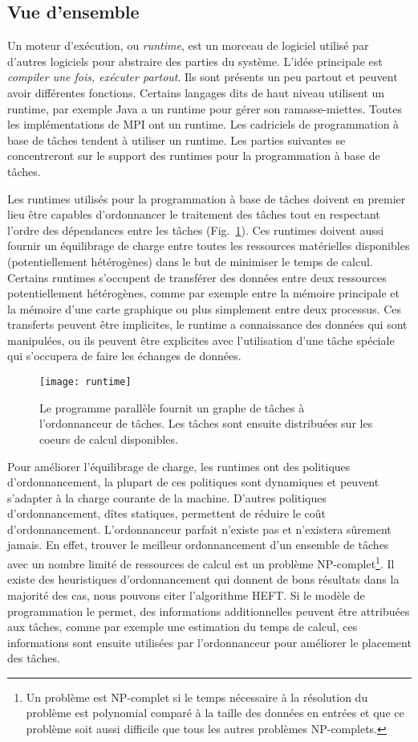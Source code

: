 \subsection{Vue d'ensemble}
Un moteur d'exécution, ou {\em runtime}, est un morceau de logiciel utilisé par d'autres logiciels pour abstraire des parties du système.
%
L'idée principale est {\em compiler une fois, exécuter partout}.
%
Ils sont présents un peu partout et peuvent avoir différentes fonctions.
%
Certains langages dits de haut niveau utilisent un runtime, par exemple Java a un runtime pour gérer son ramasse-miettes.
%
Toutes les implémentations de MPI ont un runtime.
%
Les cadriciels de programmation à base de tâches tendent à utiliser un runtime.
%
Les parties suivantes se concentreront sur le support des runtimes pour la programmation à base de tâches.

Les runtimes utilisés pour la programmation à base de tâches doivent en premier lieu être capables d'ordonnancer le traitement des tâches tout en respectant l'ordre des dépendances entre les tâches (Fig.~\ref{fig:runtime}).
%
Ces runtimes doivent aussi fournir un équilibrage de charge entre toutes les ressources matérielles disponibles (potentiellement hétérogènes) dans le but de minimiser le temps de calcul.
%
Certains runtimes s'occupent de transférer des données entre deux ressources potentiellement hétérogènes, comme par exemple entre la mémoire principale et la mémoire d'une carte graphique ou plus simplement entre deux processus.
%
Ces transferts peuvent être implicites, le runtime a connaissance des données qui sont manipulées, ou ils peuvent être explicites avec l'utilisation d'une tâche spéciale qui s'occupera de faire les échanges de données.
\begin{figure}
  \centering
  \texttt{[image: runtime]}
  \caption{Le programme parallèle fournit un graphe de tâches à l'ordonnanceur de tâches. Les tâches sont ensuite distribuées sur les coeurs de calcul disponibles.}
  \label{fig:runtime}
\end{figure}

Pour améliorer l'équilibrage de charge, les runtimes ont des politiques d'ordonnancement, la plupart de ces politiques sont dynamiques et peuvent s'adapter à la charge courante de la machine.
%
D'autres politiques d'ordonnancement, dîtes statiques, permettent de réduire le coût d'ordonnancement.
%
L'ordonnanceur parfait n'existe pas et n'existera sûrement jamais.
%
En effet, trouver le meilleur ordonnancement d'un ensemble de tâches avec un nombre limité de ressources de calcul est un problème NP-complet\footnote{Un problème est NP-complet si le temps nécessaire à la résolution du problème est polynomial comparé à la taille des données en entrées et que ce problème soit aussi difficile que tous les autres problèmes NP-complets.}.
%
Il existe des heuristiques d'ordonnancement qui donnent de bons résultats dans la majorité des cas, nous pouvons citer l'algorithme HEFT\cite{heft}.
%
Si le modèle de programmation le permet, des informations additionnelles peuvent être attribuées aux tâches, comme par exemple une estimation du temps de calcul, ces informations sont ensuite utilisées par l'ordonnanceur pour améliorer le placement des tâches.

